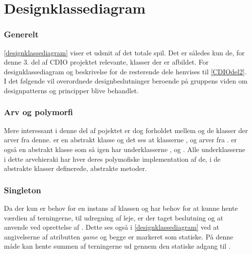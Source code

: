 \chapter{Designklassediagram}\label{chap:desKlas}
\subsection{Generelt}
\vref{designklassediagram} viser et udsnit af det totale spil. Det er således kun de, for denne 3. del af CDIO projektet relevante, klasser der er afbildet. For designklassediagram og beskrivelse for de resterende dele henvises til \vref{CDIOdel2}. I det følgende vil overordnede designbeslutninger beroende på gruppens viden om designpatterns og principper blive behandlet.

\subsection{Arv og polymorfi}
Mere interessant i denne del af pojektet er dog forholdet mellem  og de klasser der arver fra denne. er en abstrakt klasse og det ses at klasserne ,  og  arver fra .  er også en abstrakt klasse som så igen har underklasserne ,  og . Alle underklasserne i dette arvehieraki har hver deres polymofiske implementation af de, i de abstrakte klasser definerede, abstrakte metoder. 

\subsection{Singleton}
Da der kun er behov for en instans af klassen  og  har behov for at kunne hente værdien af terningerne, til udregning af leje, er der taget beslutning og at anvende  ved oprettelse af . Dette ses også i \vref{designklassediagram} ved at angivelserne af atributten \textit{game} og  begge er markeret som statiske. På denne måde kan  hente summen af terningerne ud gennem den statiske adgang til . 

	
